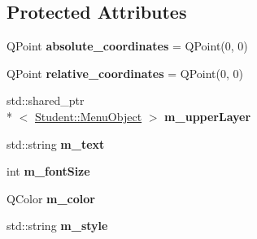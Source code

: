 \subsection*{Protected Attributes}
\begin{DoxyCompactItemize}
\item 
\hypertarget{class_student_1_1_menu_scene_item_ab7411fed5ba48da8fb93d3f607c6ad39}{Q\-Point {\bfseries absolute\-\_\-coordinates} = Q\-Point(0, 0)}\label{class_student_1_1_menu_scene_item_ab7411fed5ba48da8fb93d3f607c6ad39}

\item 
\hypertarget{class_student_1_1_menu_scene_item_a910278e93c9ba28f86d8298025f8d4b9}{Q\-Point {\bfseries relative\-\_\-coordinates} = Q\-Point(0, 0)}\label{class_student_1_1_menu_scene_item_a910278e93c9ba28f86d8298025f8d4b9}

\item 
\hypertarget{class_student_1_1_menu_scene_item_a006c51cfdb13bd6357372d50b81a508b}{std\-::shared\-\_\-ptr\\*
$<$ \hyperlink{class_student_1_1_menu_object}{Student\-::\-Menu\-Object} $>$ {\bfseries m\-\_\-upper\-Layer}}\label{class_student_1_1_menu_scene_item_a006c51cfdb13bd6357372d50b81a508b}

\item 
\hypertarget{class_student_1_1_menu_scene_item_abfecf6e6cec82d8de205be6a15916ad9}{std\-::string {\bfseries m\-\_\-text}}\label{class_student_1_1_menu_scene_item_abfecf6e6cec82d8de205be6a15916ad9}

\item 
\hypertarget{class_student_1_1_menu_scene_item_ab35368634f0ac57091275771613de555}{int {\bfseries m\-\_\-font\-Size}}\label{class_student_1_1_menu_scene_item_ab35368634f0ac57091275771613de555}

\item 
\hypertarget{class_student_1_1_menu_scene_item_ac97b66ff83fe08743f8cd65d1c7c28d9}{Q\-Color {\bfseries m\-\_\-color}}\label{class_student_1_1_menu_scene_item_ac97b66ff83fe08743f8cd65d1c7c28d9}

\item 
\hypertarget{class_student_1_1_menu_scene_item_a8fee0a60c92170cadf07d0cb8c10ea96}{std\-::string {\bfseries m\-\_\-style}}\label{class_student_1_1_menu_scene_item_a8fee0a60c92170cadf07d0cb8c10ea96}

\end{DoxyCompactItemize}


